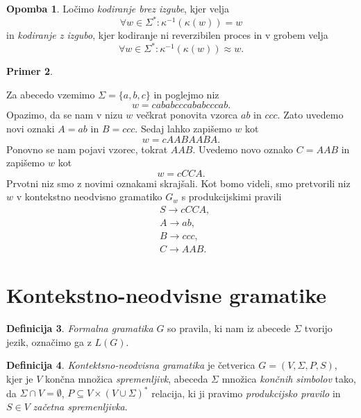 \documentclass{amsart}
\theoremstyle{definition} %
\newtheorem{definicija}{Definicija}[section]
\newtheorem{primer}[definicija]{Primer}
\newtheorem{opomba}[definicija]{Opomba}
\theoremstyle{plain} %
\begin{document}
\begin{opomba}
    
    Ločimo \textit{kodiranje brez izgube}, kjer velja
    \[
        \forall w \in \Sigma^* \colon \kappa^{-1}(\kappa(w)) = w
    \]
    in \textit{kodiranje z izgubo}, kjer kodiranje ni reverzibilen proces
    in v grobem velja
    \[
        \forall w \in \Sigma^* \colon \kappa^{-1}(\kappa(w)) \approx w.
    \]

\end{opomba}

\begin{primer}\label{Stiskanje}
    
    Za abecedo vzemimo $ \Sigma = \{ a,b,c \} $ in poglejmo niz
    \[
        w = cababcccababcccab.
    \]
    Opazimo, da se nam v nizu $ w $ večkrat ponovita vzorca $ ab $ in $ ccc $. Zato
    uvedemo novi oznaki $ A = ab $ in $ B = ccc $. Sedaj lahko zapišemo $ w $ kot
    \[
        w = \mathit{cAABAABA}.
    \]
    Ponovno se nam pojavi vzorec, tokrat $ AAB $. Uvedemo novo oznako $ C = AAB $
    in zapišemo $ w $ kot
    \[
        w = \mathit{cCCA}.
    \]
    Prvotni niz smo z novimi oznakami skrajšali. Kot bomo videli, smo
    pretvorili niz $ w $ v kontekstno neodvisno gramatiko $ G_w $ s
    produkcijskimi pravili
    \begin{align*}
        & S  \rightarrow  \mathit{cCCA}, \\
        & A  \rightarrow  \mathit{ab}, \\
        & B  \rightarrow  \mathit{ccc}, \\
        & C  \rightarrow  \mathit{AAB}.
    \end{align*}

\end{primer}

\section{Kontekstno-neodvisne gramatike}

\begin{definicija}

    \textit{Formalna gramatika} $ G $ so pravila, ki nam iz abecede $ \Sigma $ tvorijo jezik,
    označimo ga z $ L(G) $.

\end{definicija}

\begin{definicija}

    \textit{Kontektsno-neodvisna gramatika} je četverica $ G = ( V, \Sigma, P, S ) $, kjer je
    $ V $ končna množica \textit{spremenljivk}, abeceda $ \Sigma $ množica \textit{končnih simbolov} tako,
    da $ \Sigma \cap V = \emptyset $, $ P \subseteq V \times ( V \cup \Sigma )^* $ relacija, ki ji
    pravimo \textit{produkcijsko pravilo} in $ S \in V $ \textit{začetna spremenljivka}.

\end{definicija}
\end{document}
